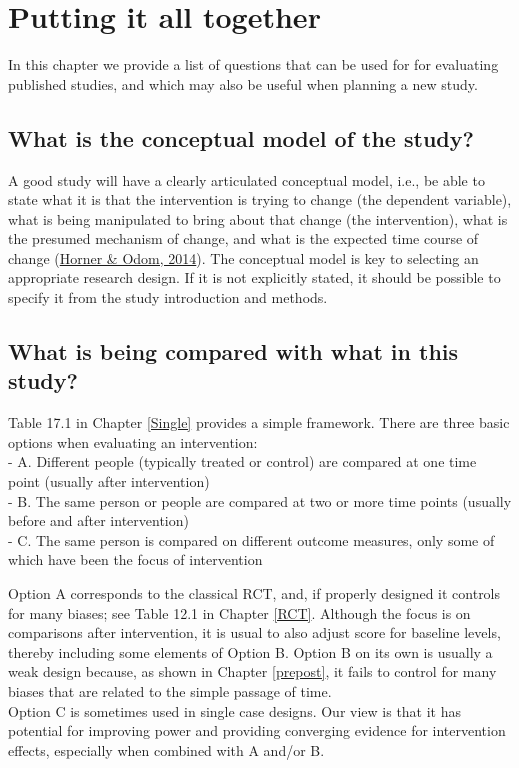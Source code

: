 \documentclass{krantz}
\begin{document}
\hypertarget{final}{%
\chapter{Putting it all together}\label{final}}

In this chapter we provide a list of questions that can be used for for evaluating published studies, and which may also be useful when planning a new study.

\hypertarget{what-is-the-conceptual-model-of-the-study}{%
\section{What is the conceptual model of the study?}\label{what-is-the-conceptual-model-of-the-study}}

A good study will have a clearly articulated conceptual model, i.e., be able to state what it is that the intervention is trying to change (the dependent variable), what is being manipulated to bring about that change (the intervention), what is the presumed mechanism of change, and what is the expected time course of change (\protect\hyperlink{ref-horner2014}{Horner \& Odom, 2014}). The conceptual model is key to selecting an appropriate research design. If it is not explicitly stated, it should be possible to specify it from the study introduction and methods.

\hypertarget{what-is-being-compared-with-what-in-this-study}{%
\section{What is being compared with what in this study?}\label{what-is-being-compared-with-what-in-this-study}}

Table 17.1 in Chapter \ref{Single} provides a simple framework. There are three basic options when evaluating an intervention:\\
- A. Different people (typically treated or control) are compared at one time point (usually after intervention)\\
- B. The same person or people are compared at two or more time points (usually before and after intervention)\\
- C. The same person is compared on different outcome measures, only some of which have been the focus of intervention

Option A corresponds to the classical RCT, and, if properly designed it controls for many biases; see Table 12.1 in Chapter \ref{RCT}. Although the focus is on comparisons after intervention, it is usual to also adjust score for baseline levels, thereby including some elements of Option B. Option B on its own is usually a weak design because, as shown in Chapter \ref{prepost}, it fails to control for many biases that are related to the simple passage of time.\\
Option C is sometimes used in single case designs. Our view is that it has potential for improving power and providing converging evidence for intervention effects, especially when combined with A and/or B.
\end{document}
